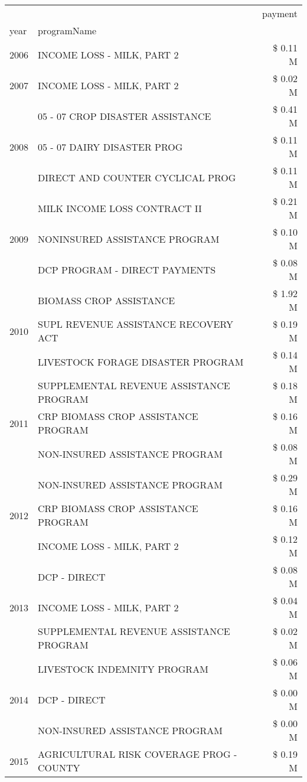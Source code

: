 \begin{tabular}{llr}
\toprule
 &  & payment \\
year & programName &  \\
\midrule
2006 & INCOME LOSS - MILK, PART 2 & \$ 0.11 M \\
\cline{1-3}
2007 & INCOME LOSS - MILK, PART 2 & \$ 0.02 M \\
\cline{1-3}
\multirow[t]{3}{*}{2008} & 05 - 07 CROP DISASTER ASSISTANCE & \$ 0.41 M \\
 & 05 - 07 DAIRY DISASTER PROG & \$ 0.11 M \\
 & DIRECT AND COUNTER CYCLICAL PROG & \$ 0.11 M \\
\cline{1-3}
\multirow[t]{3}{*}{2009} & MILK INCOME LOSS CONTRACT II & \$ 0.21 M \\
 & NONINSURED ASSISTANCE PROGRAM & \$ 0.10 M \\
 & DCP PROGRAM - DIRECT PAYMENTS & \$ 0.08 M \\
\cline{1-3}
\multirow[t]{3}{*}{2010} & BIOMASS CROP ASSISTANCE & \$ 1.92 M \\
 & SUPL REVENUE ASSISTANCE RECOVERY ACT & \$ 0.19 M \\
 & LIVESTOCK FORAGE DISASTER  PROGRAM & \$ 0.14 M \\
\cline{1-3}
\multirow[t]{3}{*}{2011} & SUPPLEMENTAL REVENUE ASSISTANCE PROGRAM & \$ 0.18 M \\
 & CRP BIOMASS CROP ASSISTANCE PROGRAM & \$ 0.16 M \\
 & NON-INSURED ASSISTANCE PROGRAM & \$ 0.08 M \\
\cline{1-3}
\multirow[t]{3}{*}{2012} & NON-INSURED ASSISTANCE PROGRAM & \$ 0.29 M \\
 & CRP BIOMASS CROP ASSISTANCE PROGRAM & \$ 0.16 M \\
 & INCOME LOSS - MILK, PART 2 & \$ 0.12 M \\
\cline{1-3}
\multirow[t]{3}{*}{2013} & DCP - DIRECT & \$ 0.08 M \\
 & INCOME LOSS - MILK, PART 2 & \$ 0.04 M \\
 & SUPPLEMENTAL REVENUE ASSISTANCE PROGRAM & \$ 0.02 M \\
\cline{1-3}
\multirow[t]{3}{*}{2014} & LIVESTOCK INDEMNITY PROGRAM & \$ 0.06 M \\
 & DCP - DIRECT & \$ 0.00 M \\
 & NON-INSURED ASSISTANCE PROGRAM & \$ 0.00 M \\
\cline{1-3}
\multirow[t]{3}{*}{2015} & AGRICULTURAL RISK COVERAGE PROG - COUNTY & \$ 0.19 M \\

\end{tabular}
